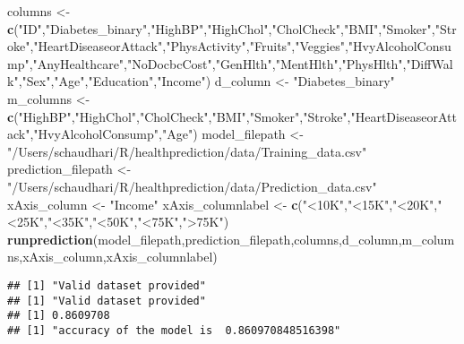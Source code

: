 \documentclass[
]{article}
\newenvironment{Shaded}{\begin{snugshade}}{\end{snugshade}}
\newcommand{\FunctionTok}[1]{\textcolor[rgb]{0.13,0.29,0.53}{\textbf{#1}}}
\newcommand{\NormalTok}[1]{#1}
\newcommand{\OtherTok}[1]{\textcolor[rgb]{0.56,0.35,0.01}{#1}}
\newcommand{\StringTok}[1]{\textcolor[rgb]{0.31,0.60,0.02}{#1}}
\begin{document}
\begin{Shaded}
\begin{Highlighting}[]
\NormalTok{columns }\OtherTok{\textless{}{-}} \FunctionTok{c}\NormalTok{(}\StringTok{"ID"}\NormalTok{,}\StringTok{"Diabetes\_binary"}\NormalTok{,}\StringTok{"HighBP"}\NormalTok{,}\StringTok{"HighChol"}\NormalTok{,}\StringTok{"CholCheck"}\NormalTok{,}\StringTok{"BMI"}\NormalTok{,}\StringTok{"Smoker"}\NormalTok{,}\StringTok{"Stroke"}\NormalTok{,}\StringTok{"HeartDiseaseorAttack"}\NormalTok{,}\StringTok{"PhysActivity"}\NormalTok{,}\StringTok{"Fruits"}\NormalTok{,}\StringTok{"Veggies"}\NormalTok{,}\StringTok{"HvyAlcoholConsump"}\NormalTok{,}\StringTok{"AnyHealthcare"}\NormalTok{,}\StringTok{"NoDocbcCost"}\NormalTok{,}\StringTok{"GenHlth"}\NormalTok{,}\StringTok{"MentHlth"}\NormalTok{,}\StringTok{"PhysHlth"}\NormalTok{,}\StringTok{"DiffWalk"}\NormalTok{,}\StringTok{"Sex"}\NormalTok{,}\StringTok{"Age"}\NormalTok{,}\StringTok{"Education"}\NormalTok{,}\StringTok{"Income"}\NormalTok{)}
\NormalTok{d\_column }\OtherTok{\textless{}{-}} \StringTok{"Diabetes\_binary"}
\NormalTok{m\_columns }\OtherTok{\textless{}{-}} \FunctionTok{c}\NormalTok{(}\StringTok{"HighBP"}\NormalTok{,}\StringTok{"HighChol"}\NormalTok{,}\StringTok{"CholCheck"}\NormalTok{,}\StringTok{"BMI"}\NormalTok{,}\StringTok{"Smoker"}\NormalTok{,}\StringTok{"Stroke"}\NormalTok{,}\StringTok{"HeartDiseaseorAttack"}\NormalTok{,}\StringTok{"HvyAlcoholConsump"}\NormalTok{,}\StringTok{"Age"}\NormalTok{)}
\NormalTok{model\_filepath }\OtherTok{\textless{}{-}} \StringTok{"/Users/schaudhari/R/healthprediction/data/Training\_data.csv"}
\NormalTok{prediction\_filepath }\OtherTok{\textless{}{-}} \StringTok{"/Users/schaudhari/R/healthprediction/data/Prediction\_data.csv"}
\NormalTok{xAxis\_column }\OtherTok{\textless{}{-}} \StringTok{"Income"}
\NormalTok{xAxis\_columnlabel }\OtherTok{\textless{}{-}} \FunctionTok{c}\NormalTok{(}\StringTok{"\textless{}10K"}\NormalTok{,}\StringTok{"\textless{}15K"}\NormalTok{,}\StringTok{"\textless{}20K"}\NormalTok{,}\StringTok{"\textless{}25K"}\NormalTok{,}\StringTok{"\textless{}35K"}\NormalTok{,}\StringTok{"\textless{}50K"}\NormalTok{,}\StringTok{"\textless{}75K"}\NormalTok{,}\StringTok{"\textgreater{}75K"}\NormalTok{)}
\FunctionTok{runprediction}\NormalTok{(model\_filepath,prediction\_filepath,columns,d\_column,m\_columns,xAxis\_column,xAxis\_columnlabel)}
\end{Highlighting}
\end{Shaded}

\begin{verbatim}
## [1] "Valid dataset provided"
## [1] "Valid dataset provided"
## [1] 0.8609708
## [1] "accuracy of the model is  0.860970848516398"
\end{verbatim}
\end{document}
